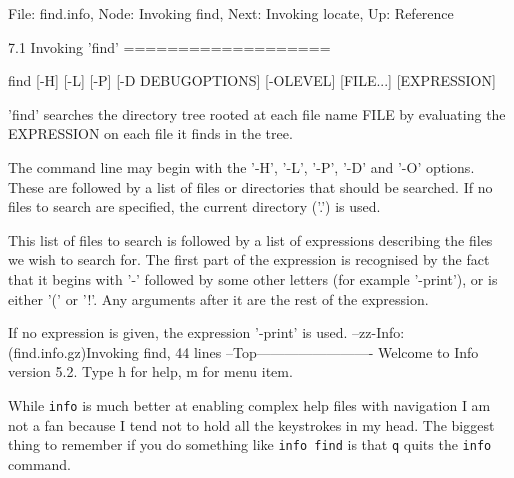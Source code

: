 \documentclass[10pt,american,]{book}
\newenvironment{Shaded}{\begin{snugshade}}{\end{snugshade}}
\newcommand{\KeywordTok}[1]{\textcolor[rgb]{0.13,0.29,0.53}{\textbf{{#1}}}}
\newcommand{\StringTok}[1]{\textcolor[rgb]{0.31,0.60,0.02}{{#1}}}
\newcommand{\NormalTok}[1]{{#1}}
\numberwithin{figure}{chapter}
\renewcommand{\KeywordTok}[1]{{#1}}
\renewcommand{\StringTok}[1]{{#1}}
\renewcommand{\NormalTok}[1]{{#1}}
\begin{document}
\begin{Shaded}
\begin{Highlighting}[]
\KeywordTok{File}\NormalTok{: find.info,  Node: Invoking find,  Next: Invoking locate,  Up: Reference}

\KeywordTok{7.1} \NormalTok{Invoking }\StringTok{'find'}
\NormalTok{===================}

     \KeywordTok{find} \NormalTok{[-H] [-L] [-P] [-D DEBUGOPTIONS] [-OLEVEL] [FILE...] [EXPRESSION]}

   \StringTok{'find'} \KeywordTok{searches} \NormalTok{the directory tree rooted at each file name FILE by}
\KeywordTok{evaluating} \NormalTok{the EXPRESSION on each file it finds in the tree.}

   \KeywordTok{The} \NormalTok{command line may begin with the }\StringTok{'-H'}\NormalTok{, }\StringTok{'-L'}\NormalTok{, }\StringTok{'-P'}\NormalTok{, }\StringTok{'-D'} \NormalTok{and }\StringTok{'-O'}
\KeywordTok{options.}  \NormalTok{These are followed by a list of files or directories that}
\KeywordTok{should} \NormalTok{be searched.  If no files to search are specified, the current}
\KeywordTok{directory} \NormalTok{(}\StringTok{'.'}\NormalTok{) }\KeywordTok{is} \NormalTok{used.}

   \KeywordTok{This} \NormalTok{list of files to search is followed by a list of expressions}
\KeywordTok{describing} \NormalTok{the files we wish to search for.  The first part of the}
\KeywordTok{expression} \NormalTok{is recognised by the fact that it begins with }\StringTok{'-'} \NormalTok{followed by}
\KeywordTok{some} \NormalTok{other letters (for example }\StringTok{'-print'}\NormalTok{), }\KeywordTok{or} \NormalTok{is either }\StringTok{'('} \NormalTok{or }\StringTok{'!'}\NormalTok{.  Any}
\KeywordTok{arguments} \NormalTok{after it are the rest of the expression.}

   \KeywordTok{If} \NormalTok{no expression is given, the expression }\StringTok{'-print'} \NormalTok{is used.}
\KeywordTok{--zz-Info}\NormalTok{: (find.info.gz)}\KeywordTok{Invoking} \NormalTok{find, 44 lines --Top-------------------------}
\KeywordTok{Welcome} \NormalTok{to Info version 5.2. Type h for help, m for menu item.}
\end{Highlighting}
\end{Shaded}

While \texttt{info} is much better at enabling complex help files with
navigation I am not a fan because I tend not to hold all the keystrokes
in my head. The biggest thing to remember if you do something like
\texttt{info\ find} is that \texttt{q} quits the \texttt{info} command.
\end{document}
